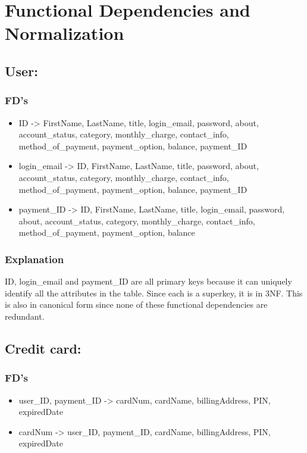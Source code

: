 \newpage
\section{Functional Dependencies and Normalization}


\subsection{User:}
\subsubsection{FD's}
\begin{itemize}
    \item ID -> FirstName, LastName, title, login\_email, password, about, account\_status, category, monthly\_charge, contact\_info, method\_of\_payment, payment\_option, balance, payment\_ID
    \item login\_email -> ID, FirstName, LastName, title, password, about, account\_status, category, monthly\_charge, contact\_info, method\_of\_payment, payment\_option, balance, payment\_ID
    \item payment\_ID -> ID, FirstName, LastName, title, login\_email, password, about, account\_status, category, monthly\_charge, contact\_info, method\_of\_payment, payment\_option, balance
\end{itemize}

\subsubsection{Explanation}
ID, login\_email and payment\_ID are all primary keys because it can uniquely identify all the attributes in the table. Since each is a superkey, it is in 3NF. This is also in canonical form since none of these functional dependencies are redundant.

\subsection{Credit card:}
\subsubsection{FD's}
\begin{itemize}
    \item user\_ID, payment\_ID -> cardNum, cardName, billingAddress, PIN, expiredDate
    \item cardNum -> user\_ID, payment\_ID, cardName, billingAddress, PIN, expiredDate
\end{itemize}

